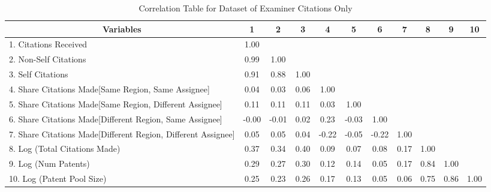 \begin{center}
\begin{table}[htbp]\centering \caption{Correlation Table for Dataset of Examiner Citations Only \label{e.corrtable}}
\scriptsize
\singlespacing
\begin{adjustbox}{angle=0}
\begin{tabular}{l  c  c  c  c  c  c  c  c  c  c }

\hline
\multicolumn{1}{c}{Variables} &1&2&3&4&5&6&7&8&9&10\\ \hline
1. Citations Received&1.00\\
2. Non-Self Citations&0.99&1.00\\
3. Self Citations&0.91&0.88&1.00\\
4. Share Citations Made[Same Region, Same Assignee]&0.04&0.03&0.06&1.00\\
5. Share Citations Made[Same Region, Different Assignee]&0.11&0.11&0.11&0.03&1.00\\
6. Share Citations Made[Different Region, Same Assignee]&-0.00&-0.01&0.02&0.23&-0.03&1.00\\
7. Share Citations Made[Different Region, Different Assignee]&0.05&0.05&0.04&-0.22&-0.05&-0.22&1.00\\
8. Log (Total Citations Made)&0.37&0.34&0.40&0.09&0.07&0.08&0.17&1.00\\
9. Log (Num Patents)&0.29&0.27&0.30&0.12&0.14&0.05&0.17&0.84&1.00\\
10. Log (Patent Pool Size)&0.25&0.23&0.26&0.17&0.13&0.05&0.06&0.75&0.86&1.00\\
\end{tabular}
\end{adjustbox}
\end{table}
\end{center}
